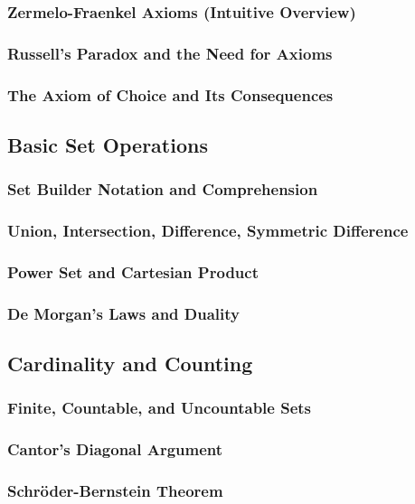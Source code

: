 \subsubsection{Zermelo-Fraenkel Axioms (Intuitive Overview)}
\subsubsection{Russell's Paradox and the Need for Axioms}
\subsubsection{The Axiom of Choice and Its Consequences}

\subsection{Basic Set Operations}
\label{subsec:set-operations}

\subsubsection{Set Builder Notation and Comprehension}
\subsubsection{Union, Intersection, Difference, Symmetric Difference}
\subsubsection{Power Set and Cartesian Product}
\subsubsection{De Morgan's Laws and Duality}

\subsection{Cardinality and Counting}
\label{subsec:cardinality}

\subsubsection{Finite, Countable, and Uncountable Sets}
\subsubsection{Cantor's Diagonal Argument}
\subsubsection{Schröder-Bernstein Theorem}
